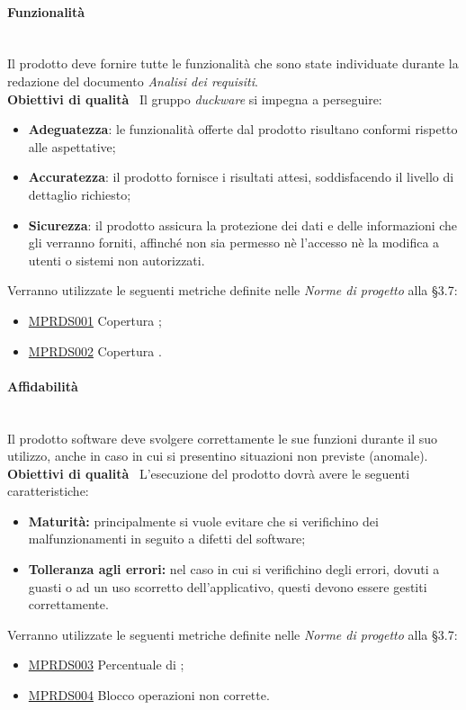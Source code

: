 \paragraph{Funzionalità}\mbox{}\\
Il prodotto deve fornire tutte le funzionalità che sono state individuate durante la redazione del documento \emph{Analisi dei requisiti}.\\[0.4cm]
\textbf{Obiettivi di qualità} \ Il gruppo \emph{duckware} si impegna a perseguire:
\begin{itemize}
	\item \textbf{Adeguatezza}: le funzionalità offerte dal prodotto risultano conformi rispetto alle aspettative;
	\item \textbf{Accuratezza}: il prodotto fornisce i risultati attesi, soddisfacendo il livello di dettaglio richiesto;
	\item \textbf{Sicurezza}: il prodotto assicura la protezione dei dati e delle informazioni che gli verranno forniti, affinché non sia permesso nè l'accesso nè la modifica a utenti o sistemi non autorizzati.
\end{itemize}
Verranno utilizzate le seguenti metriche definite nelle \textit{Norme di progetto} alla §3.7:
\begin{itemize}
	\item \hyperref[sec:qualita_software]{MPRDS001} Copertura ;
	\item \hyperref[sec:qualita_software]{MPRDS002} Copertura .
\end{itemize}

\paragraph{Affidabilità}\mbox{}\\[0.4cm]
Il prodotto software deve svolgere correttamente le sue funzioni durante il suo utilizzo, anche in caso in cui si presentino situazioni non previste (anomale).\\ 
\textbf{Obiettivi di qualità} \ L'esecuzione del prodotto dovrà avere le seguenti caratteristiche:
\begin{itemize}
	\item \textbf{Maturità:} principalmente si vuole evitare che si verifichino dei malfunzionamenti in seguito a difetti del software;
	\item \textbf{Tolleranza agli errori:} nel caso in cui si verifichino degli errori, dovuti a guasti o ad un uso scorretto dell'applicativo, questi devono essere gestiti correttamente.
\end{itemize}
Verranno utilizzate le seguenti metriche definite nelle \textit{Norme di progetto} alla §3.7:
\begin{itemize}
	\item \hyperref[sec:qualita_software]{MPRDS003} Percentuale di ;
	\item \hyperref[sec:qualita_software]{MPRDS004} Blocco operazioni non corrette.
\end{itemize}

